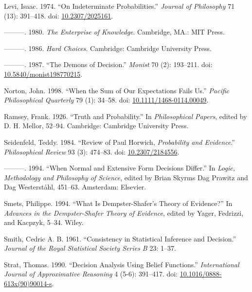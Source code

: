 \documentclass[
  11pt,
  letterpaper,
  DIV=11,
  numbers=noendperiod,
  twoside]{scrartcl}
\newlength{\cslhangindent}
\newenvironment{CSLReferences}[2] %
 {\begin{list}{}{%
  \setlength{\itemindent}{0pt}
  \setlength{\leftmargin}{0pt}
  \setlength{\parsep}{0pt}
  \ifodd #1
   \setlength{\leftmargin}{\cslhangindent}
   \setlength{\itemindent}{-1\cslhangindent}
  \fi
  \setlength{\itemsep}{#2\baselineskip}}}
 {\end{list}}
\begin{document}
\begin{CSLReferences}{1}{0}
Levi, Isaac. 1974. {``On Indeterminate Probabilities.''} \emph{Journal
of Philosophy} 71 (13): 391--418. doi:
\href{https://doi.org/10.2307/2025161}{10.2307/2025161}.

---------. 1980. \emph{The Enterprise of Knowledge}. Cambridge, MA.: MIT
Press.

---------. 1986. \emph{Hard Choices}. Cambridge: Cambridge University
Press.

---------. 1987. {``The Demons of Decision.''} \emph{Monist} 70 (2):
193--211. doi:
\href{https://doi.org/10.5840/monist198770215}{10.5840/monist198770215}.

Norton, John. 1998. {``When the Sum of Our Expectations Fails Us.''}
\emph{Pacific Philosophical Quarterly} 79 (1): 34--58. doi:
\href{https://doi.org/10.1111/1468-0114.00049}{10.1111/1468-0114.00049}.

Ramsey, Frank. 1926. {``Truth and Probability.''} In \emph{Philosophical
Papers}, edited by D. H. Mellor, 52--94. Cambridge: Cambridge University
Press.

Seidenfeld, Teddy. 1984. {``Review of Paul Horwich, \emph{Probability
and Evidence}.''} \emph{Philosophical Review} 93 (3): 474--83. doi:
\href{https://doi.org/10.2307/2184556}{10.2307/2184556}.

---------. 1994. {``When Normal and Extensive Form Decisions Differ.''}
In \emph{Logic, Methodology and Philosophy of Science}, edited by Brian
Skyrms Dag Prawitz and Dag Westerståhl, 451--63. Amsterdam: Elsevier.

Smets, Philippe. 1994. {``What Is Dempster-Shafer's Theory of
Evidence?''} In \emph{Advances in the Dempster-Shafer Theory of
Evidence}, edited by Yager, Fedrizzi, and Kacpzyk, 5--34. Wiley.

Smith, Cedric A. B. 1961. {``Consistency in Statistical Inference and
Decision.''} \emph{Journal of the Royal Statistical Society Series B}
23: 1--37.

Strat, Thomas. 1990. {``Decision Analysis Using Belief Functions.''}
\emph{International Journal of Approximative Reasoning} 4 (5-6):
391--417. doi:
\href{https://doi.org/10.1016/0888-613x(90)90014-s}{10.1016/0888-613x(90)90014-s}.


\end{CSLReferences}
\end{document}
